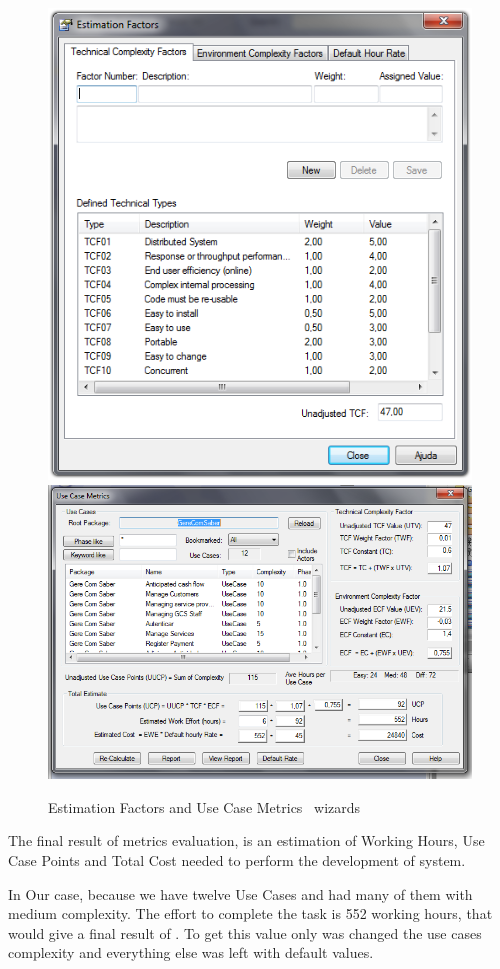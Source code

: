 \begin{figure}[h]
\includegraphics[scale=0.257]{images/sparxestim.png}
\hspace{0.1cm}
\includegraphics[scale=0.29]{images/sparx.png}
\caption{Estimation Factors and Use Case Metrics \entArch\ wizards}\label{img:sparxRes}
\end{figure}

The final result of metrics evaluation, is an estimation of Working Hours, Use Case Points\cite{Ribu01estimatingobject-oriented} and Total Cost needed to perform the development of system.

In Our case, because we have twelve Use Cases and had many of them with medium complexity. The effort to complete the task is 552 working hours, that would give a final result of . 
To get this value only was changed the use cases complexity and everything else was left with default values.
